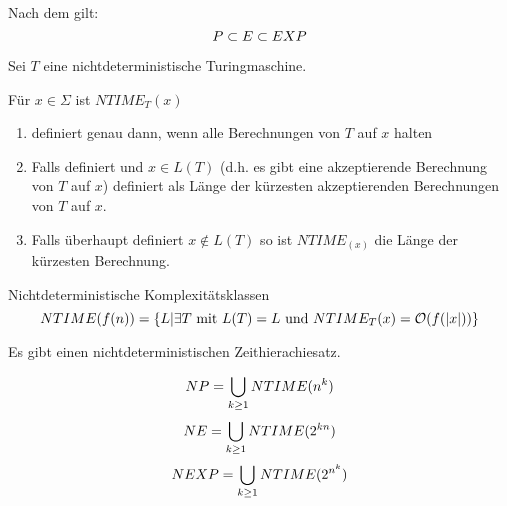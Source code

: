 Nach dem  gilt:
$$ P \subset E \subset EXP $$














\begin{definition}

    Sei $T$ eine nichtdeterministische Turingmaschine. 

    Für $x \in \Sigma$ ist $NTIME_T(x)$
    \begin{enumerate}
        \item definiert genau dann, wenn alle Berechnungen von $T$ auf $x$ halten
        \item Falls definiert und $x \in L(T)$ (d.h. es gibt eine akzeptierende Berechnung von $T$ auf $x$) definiert als Länge der kürzesten akzeptierenden Berechnungen von $T$ auf $x$.
        \item Falls überhaupt definiert $x \notin L(T)$ so ist $NTIME_{(x)}$ die Länge der kürzesten Berechnung.
    \end{enumerate}

\end{definition}


\begin{definition}
    Nichtdeterministische Komplexitätsklassen 
    $$ NTIME(f(n)) = \{ L | \exists T \text{ mit } L(T)=L \text{ und } NTIME_T(x) = \mathcal{O}(f(|x|)) \} $$

    Es gibt einen nichtdeterministischen Zeithierachiesatz.




    $$ NP   = \bigcup_{k \geq 1} NTIME(n^k) $$
    $$ NE   = \bigcup_{k \geq 1} NTIME(2^{kn}) $$
    $$ NEXP = \bigcup_{k \geq 1} NTIME(2^{n^k}) $$

\end{definition}


